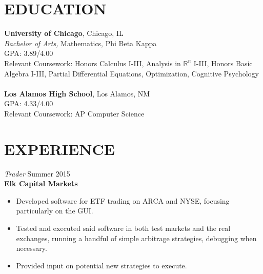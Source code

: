 \documentclass[margin, 10pt]{res} %
\begin{document}
\begin{resume}

% 
%


\section{EDUCATION}

\textbf{University of Chicago}, Chicago, IL \\
{\sl Bachelor of Arts,} Mathematics, Phi Beta Kappa \\
GPA: 3.89/4.00 \\
Relevant Coursework: Honors Calculus I-III, Analysis in $\mathbb{R}^n$ I-III, Honors Basic Algebra I-III, Partial Differential Equations, Optimization, Cognitive Psychology \\\\
\textbf{Los Alamos High School}, Los Alamos, NM \\
GPA: 4.33/4.00 \\
Relevant Coursework: AP Computer Science
 
 
\section{EXPERIENCE}

{\sl Trader} \hfill Summer 2015 \\
\textbf{Elk Capital Markets}

\begin{itemize} \itemsep -2pt %
\item Developed software for ETF trading on ARCA and NYSE, focusing particularly on the GUI. 
\item Tested and executed said software in both test markets and the real exchanges, running a handful of simple arbitrage strategies, debugging when necessary. 
\item Provided input on potential new strategies to execute. 
\end{itemize}


\end{resume}
\end{document}
